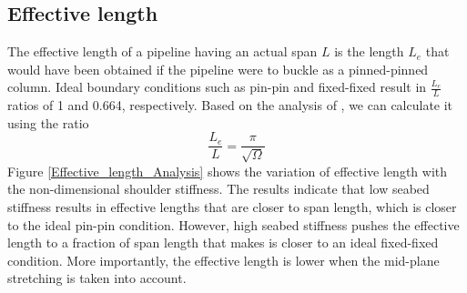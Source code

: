 \documentclass[3p,doublespacing,authoryear,11pt]{elsarticle} %
\begin{document}
\subsection{Effective length}
The effective length of a pipeline having an actual span $L$ is the length $L_e$ that would have been obtained if the pipeline were to buckle as a pinned-pinned column. Ideal boundary conditions such as pin-pin and fixed-fixed result in $\frac{L_e}{L}$ ratios of 1 and 0.664, respectively. Based on the analysis of \cite{Hobbs86}, we can calculate it using the ratio \[\frac{L_e}{L} = \frac{\pi}{\sqrt{\Omega}}\] Figure \ref{Effective_length_Analysis} shows the variation of effective length with the non-dimensional shoulder stiffness. The results indicate that low seabed stiffness results in effective lengths that are closer to span length, which is closer to the ideal pin-pin condition. However, high seabed stiffness pushes the effective length to a fraction of span length that makes is closer to an ideal fixed-fixed condition. More importantly, the effective length is lower when the mid-plane stretching is taken into account. 
\end{document}
